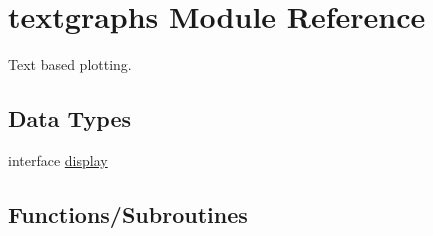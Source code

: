 \hypertarget{namespacetextgraphs}{}\section{textgraphs Module Reference}
\label{namespacetextgraphs}


Text based plotting.  


\subsection*{Data Types}
\begin{DoxyCompactItemize}
\item 
interface \hyperlink{interfacetextgraphs_1_1display}{display}
\end{DoxyCompactItemize}
\subsection*{Functions/\+Subroutines}
